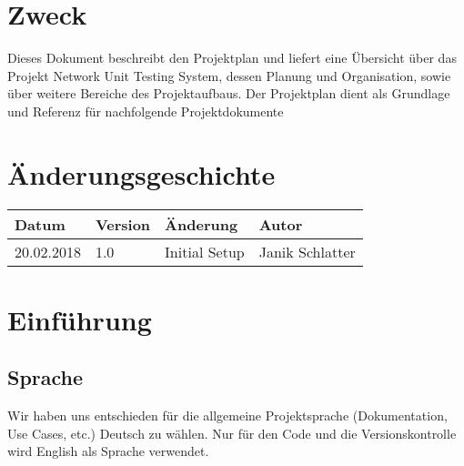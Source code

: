 \documentclass[
	ngerman,
	toc=listof, %
	toc=bibliography, %
	footnotes=multiple, %
	parskip=half, %
	numbers=noendperiod %
]{scrartcl}
\newcommand{\vorlagenOrdner}{../../99_Vorlagen} %
\begin{document}
\thispagestyle{plain}

\cleardoublepage


\section*{Zweck}
Dieses Dokument beschreibt den Projektplan und liefert eine Übersicht über das Projekt Network Unit Testing System, dessen Planung und Organisation, sowie über weitere Bereiche des Projektaufbaus. Der Projektplan dient als Grundlage und Referenz für nachfolgende Projektdokumente

\section*{Änderungsgeschichte}
\begin{tabularx}{0.9\textwidth}{llXl}
	\toprule
	Datum & Version & Änderung & Autor \\
	\midrule
	20.02.2018 & 1.0 & Initial Setup & Janik Schlatter \\
	\bottomrule
\end{tabularx}
\cleardoublepage

{}
\tableofcontents
\cleardoublepage

\let\stdsection\section
\renewcommand\section{\clearpage\stdsection}

\section{Einführung}

	\subsection{Sprache}
		Wir haben uns entschieden für die allgemeine Projektsprache (Dokumentation, Use Cases, etc.) Deutsch zu wählen.
		Nur für den Code und die Versionskontrolle wird English als Sprache verwendet.
\end{document}
